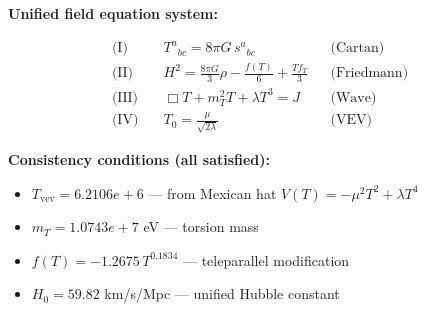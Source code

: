 
\textbf{Unified field equation system:}

\begin{align}
  \text{(I)} \quad & T^a{}_{bc} = 8\pi G \, s^a{}_{bc} && \text{(Cartan)} \\
  \text{(II)} \quad & H^2 = \frac{8\pi G}{3}\rho - \frac{f(T)}{6} + \frac{Tf_T}{3} && \text{(Friedmann)} \\
  \text{(III)} \quad & \Box T + m_T^2 T + \lambda T^3 = J && \text{(Wave)} \\
  \text{(IV)} \quad & T_0 = \frac{\mu}{\sqrt{2\lambda}} && \text{(VEV)}
\end{align}

\textbf{Consistency conditions (all satisfied):}
\begin{itemize}
  \item $T_{\text{vev}} = 6.2106e+6$ — from Mexican hat $V(T) = -\mu^2 T^2 + \lambda T^4$
  \item $m_T = 1.0743e+7$ eV — torsion mass
  \item $f(T) = -1.2675 \, T^{0.1834}$ — teleparallel modification
  \item $H_0 = 59.82$ km/s/Mpc — unified Hubble constant
\end{itemize}
